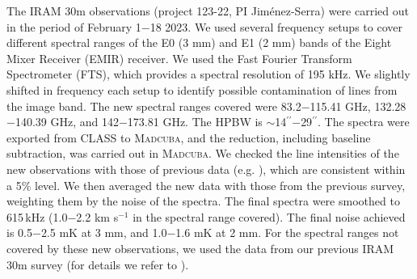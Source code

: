 \documentclass[twocolumn]{aastex63}
\begin{document}
The IRAM 30m observations (project 123-22, PI Jim\'enez-Serra) were carried out in the period of February 1$-$18 2023. We used several frequency setups to cover different spectral ranges of the E0 (3 mm) and E1 (2 mm) bands of the Eight Mixer Receiver (EMIR) receiver. We used the Fast Fourier Transform Spectrometer (FTS), which provides a spectral resolution of 195 kHz. We slightly shifted in frequency each setup to identify possible contamination of lines from the image band. 
%
The new spectral ranges covered were 83.2$-$115.41 GHz, 132.28$-$140.39 GHz, and 142$-$173.81 GHz. The HPBW is $\sim$14$^{\prime\prime}$$-$29$^{\prime\prime}$. The spectra were exported from CLASS to \textsc{Madcuba}, and the reduction, including baseline subtraction, was carried out in \textsc{Madcuba}. We checked the line intensities of the new observations with those of previous data (e.g. \citealt{rodriguez-almeida2021a,rivilla2021a}), which are consistent within a 5$\%$ level. We then averaged the new data with those from the previous survey, weighting them by the noise of the spectra. 
The final spectra were smoothed to 615\,kHz (1.0$-$2.2 km s$^{-1}$ in the spectral range covered).
The final noise achieved is 0.5$-$2.5 mK at 3 mm, and 1.0$-$1.6 mK at 2 mm. For the spectral ranges not covered by these new observations, we used the data from our previous IRAM 30m survey (for details we refer to \citealt{rodriguez-almeida2021a,rivilla2022b,rivilla2022c}).
\end{document}
